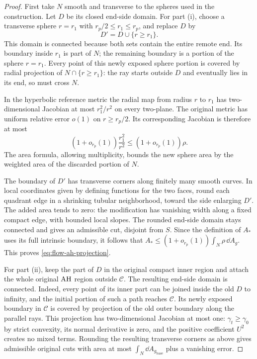 \begin{proof}
First take $N$ smooth and transverse to the spheres used in the
construction.  Let $D$ be its closed end-side domain.  For part
\textup{(i)}, choose a transverse sphere $r=r_1$ with
$r_p/2\le r_1\le r_p$, and replace $D$ by
\begin{equation}\label{eq:flow-projected-domain}
 D'=D\cup\{r\ge r_1\}.
\end{equation}
This domain is connected because both sets contain the entire remote
end.  Its boundary inside $r_1$ is part of $N$; the remaining boundary
is a portion of the sphere $r=r_1$.  Every point of this newly exposed
sphere portion is covered by radial projection of $N\cap\{r\ge r_1\}$:
the ray starts outside $D$ and eventually lies in its end, so must
cross $N$.

In the hyperbolic reference metric the radial map from radius $r$ to
$r_1$ has two-dimensional Jacobian at most $r_1^2/r^2$ on every
two-plane.  The original metric has uniform relative error $o(1)$
on $r\ge r_p/2$.  Its corresponding Jacobian is therefore at most
\begin{equation}\label{eq:flow-projection-jacobian}
 (1+o_{r_p}(1))\frac{r_1^2}{r^2}
 \le(1+o_{r_p}(1))\rho.
\end{equation}
The area formula, allowing multiplicity, bounds the new sphere area
by the weighted area of the discarded portion of $N$.

The boundary of $D'$ has transverse corners along finitely many
smooth curves.  In local coordinates given by defining functions for
the two faces, round each quadrant edge in a shrinking tubular
neighborhood, toward the side enlarging $D'$.  The added area tends
to zero: the modification has vanishing width along a fixed compact
edge, with bounded local slopes.  The rounded end-side domain stays
connected and gives an admissible cut, disjoint from $S$.  Since the
definition of $A_*$ uses its full intrinsic boundary, it follows that
$A_*\le(1+o_{r_p}(1))\int_N\rho\,\dd A_g$.  This proves
\eqref{eq:flow-ah-projection}.

For part \textup{(ii)}, keep the part of $D$ in the original compact
inner region and attach the whole original $\mathrm{AH}$ region outside
$\mathcal C$.  The resulting end-side domain is connected.  Indeed,
every point of its inner part can be joined inside the old $D$ to
infinity, and the initial portion of such a path reaches
$\mathcal C$.  Its newly exposed boundary in $\mathcal C$ is covered
by projection of the old outer boundary along the parallel rays.
This projection has two-dimensional Jacobian at most one:
$\gamma_t\ge\gamma_0$ by strict convexity, its normal derivative is
zero, and the positive coefficient $U^2$ creates no mixed terms.
Rounding the resulting transverse corners as above gives admissible
original cuts with area at most
$\int_N\dd A_{g_{\mathrm{base}}}$ plus a vanishing error.


\end{proof}

